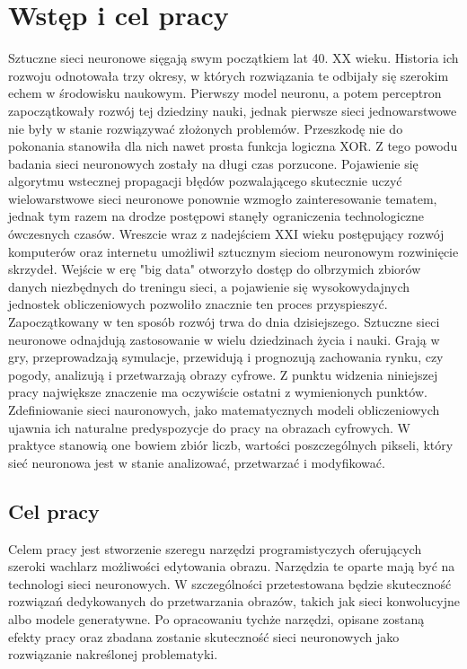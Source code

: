 \section{Wstęp i cel pracy}

  \tab Sztuczne sieci neuronowe sięgają swym początkiem lat 40. XX wieku. Historia ich rozwoju odnotowała trzy okresy, w których rozwiązania te odbijały się szerokim echem w środowisku naukowym.
  \newline \tab Pierwszy model neuronu, a potem perceptron zapoczątkowały rozwój tej dziedziny nauki, jednak pierwsze sieci jednowarstwowe nie były w stanie rozwiązywać złożonych problemów. Przeszkodę nie do pokonania stanowiła dla nich nawet prosta funkcja logiczna XOR. Z tego powodu badania sieci neuronowych zostały na długi czas porzucone.
  \newline \tab Pojawienie się algorytmu wstecznej propagacji błędów pozwalającego skutecznie uczyć wielowarstwowe sieci neuronowe ponownie wzmogło zainteresowanie tematem, jednak tym razem na drodze postępowi stanęły ograniczenia technologiczne ówczesnych czasów.
  \newline \tab Wreszcie wraz z nadejściem XXI wieku postępujący rozwój komputerów oraz internetu umożliwił sztucznym sieciom neuronowym rozwinięcie skrzydeł. Wejście w erę "big data" otworzyło dostęp do olbrzymich zbiorów danych niezbędnych do treningu sieci, a pojawienie się wysokowydajnych jednostek obliczeniowych pozwoliło znacznie ten proces przyspieszyć.
  \newline \tab Zapoczątkowany w ten sposób rozwój trwa do dnia dzisiejszego. Sztuczne sieci neuronowe odnajdują zastosowanie w wielu dziedzinach życia i nauki. Grają w gry, przeprowadzają symulacje, przewidują i prognozują zachowania rynku, czy pogody, analizują i przetwarzają obrazy cyfrowe.
  \newline \tab Z punktu widzenia niniejszej pracy największe znaczenie ma oczywiście ostatni z wymienionych punktów. Zdefiniowanie sieci nauronowych, jako matematycznych modeli obliczeniowych ujawnia ich naturalne predyspozycje do pracy na obrazach cyfrowych. W praktyce stanowią one bowiem zbiór liczb, wartości poszczególnych pikseli, który sieć neuronowa jest w stanie analizować, przetwarzać i modyfikować.

  \subsection{Cel pracy}
    \tab Celem pracy jest stworzenie szeregu narzędzi programistyczych oferujących szeroki wachlarz możliwości edytowania obrazu. Narzędzia te oparte mają być na technologi sieci neuronowych. W szczególności przetestowana będzie skuteczność rozwiązań dedykowanych do przetwarzania obrazów, takich jak sieci konwolucyjne albo modele generatywne.
    \newline
    \tab Po opracowaniu tychże narzędzi, opisane zostaną efekty pracy oraz zbadana zostanie skuteczność sieci neuronowych jako rozwiązanie nakreślonej problematyki.

